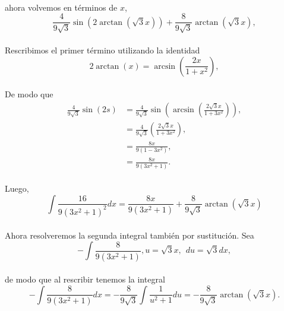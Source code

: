 \documentclass{article}
\begin{document}
\paragraph{}ahora volvemos en términos de $x$,
$$ \frac{4}{9\sqrt{3}} \sin{(2\arctan{(\sqrt{3}x)})} + \frac{8}{9\sqrt{3}}\arctan{(\sqrt{3}x)},$$
\paragraph{} Rescribimos el primer término utilizando la identidad
$$2\arctan{(x)} = \arcsin{\left(\frac{2x}{1+x^2}\right)},$$
\paragraph{}De modo que
\begin{align*}
\frac{4}{9\sqrt{3}} \sin{(2s)} &= \frac{4}{9\sqrt{3}} \sin{\left(\arcsin{\left(\frac{2\sqrt{3}x}{1+ 3x^2}\right)}\right)},\\
&= \frac{4}{9\sqrt{3}} \left(\frac{2\sqrt{3}x}{1+ 3x^2}\right),\\
&= \frac{8x}{9(1 - 3x^2)},\\
&= \frac{8x}{9(3x^2 + 1)}.
\end{align*}
\paragraph{} Luego,
$$\int \frac{16}{9(3x^2 + 1)^2} dx = \frac{8x}{9(3x^2 + 1)} + \frac{8}{9\sqrt{3}}\arctan{(\sqrt{3}x)}$$
\paragraph{}Ahora resolveremos la segunda integral también por sustitución. Sea
$$- \int \frac{8}{9(3x^2 +1)}, u=\sqrt{3}x, \hspace{5pt} du = \sqrt{3}dx,$$
\paragraph{} de modo que al rescribir tenemos la integral
$$- \int \frac{8}{9(3x^2 +1)} dx = -\frac{8}{9\sqrt{3}} \int \frac{1}{u^2 + 1} du = -\frac{8}{9\sqrt{3}} \arctan{(\sqrt{3}x)}.$$
\end{document}
